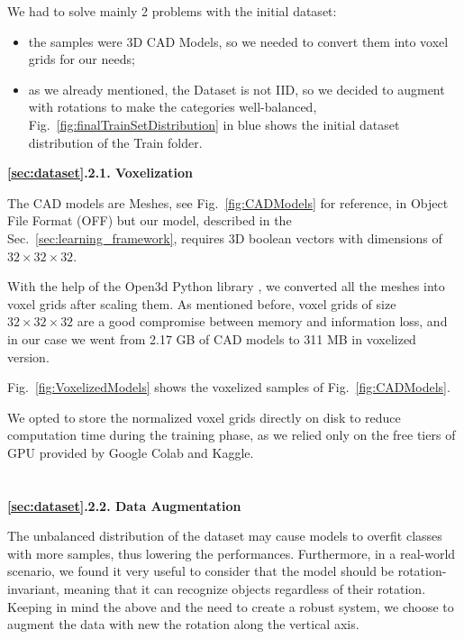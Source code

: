 We had to solve mainly 2 problems with the initial dataset:
\begin{itemize}
    \item the samples were 3D CAD Models, so we needed to convert them into voxel grids for our needs;
    \item as we already mentioned, the Dataset is not \ac{IID}, so we decided to augment with rotations to make the categories well-balanced, Fig.~\ref{fig:finalTrainSetDistribution} in blue shows the initial dataset distribution of the Train folder.
\end{itemize}
\textbf{\ref{sec:dataset}.2.1. Voxelization}

The CAD models are Meshes, see Fig.~\ref{fig:CADModels} for reference, in Object File Format (OFF) but our model, described in the Sec.~\ref{sec:learning_framework}, requires 3D boolean vectors with dimensions of \mbox{$32\times32\times32$}.

With the help of the Open3d Python library \cite{Zhou2018}, we converted all the meshes into voxel grids after scaling them. 
As mentioned before, voxel grids of size \mbox{$32\times32\times32$} are a good compromise between memory and information loss, and in our case we went from 2.17 GB of CAD models to 311 MB in voxelized version. 

Fig.~\ref{fig:VoxelizedModels} shows the voxelized samples of Fig.~\ref{fig:CADModels}.

We opted to store the normalized voxel grids directly on disk to reduce computation time during the training phase, as we relied only on the free tiers of GPU provided by Google Colab and Kaggle.\\
\ \\\\%
\textbf{\ref{sec:dataset}.2.2. Data Augmentation}

The unbalanced distribution of the dataset may cause models to overfit classes with more samples, thus lowering the performances. 
Furthermore, in a real-world scenario, we found it very useful to consider that the model should be rotation-invariant, meaning that it can recognize objects regardless of their rotation.
Keeping in mind the above and the need to create a robust system, we choose to augment the data with new the rotation along the vertical axis. 

